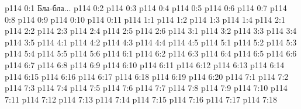 \author{Глава Серафимов}
\vs p114 0:1  Бла-бла...
\vs p114 0:2 
\vs p114 0:3 
\vs p114 0:4 
\vs p114 0:5 
\vs p114 0:6 
\vs p114 0:7 
\vs p114 0:8 
\vs p114 0:9 
\vs p114 0:10 
\vs p114 0:11 
\vs p114 1:1 
\vs p114 1:2 
\vs p114 1:3 
\vs p114 1:4 
\vs p114 2:1 
\vs p114 2:2 
\vs p114 2:3 
\vs p114 2:4 
\vs p114 2:5 
\vs p114 2:6 
\vs p114 3:1 
\vs p114 3:2 
\vs p114 3:3 
\vs p114 3:4 \pc 
\vs p114 3:5 
\vs p114 4:1 
\vs p114 4:2 
\vs p114 4:3 
\vs p114 4:4 \pc 
\vs p114 4:5 
\vs p114 5:1 
\vs p114 5:2 
\vs p114 5:3 
\vs p114 5:4 
\vs p114 5:5 \pc 
\vs p114 5:6 
\vs p114 6:1 
\vs p114 6:2 
\vs p114 6:3 
\vs p114 6:4 
\vs p114 6:5 
\vs p114 6:6 
\vs p114 6:7 
\vs p114 6:8 
\vs p114 6:9 
\vs p114 6:10 
\vs p114 6:11 
\vs p114 6:12 
\vs p114 6:13 
\vs p114 6:14 
\vs p114 6:15 
\vs p114 6:16 
\vs p114 6:17 \pc 
\vs p114 6:18 
\vs p114 6:19 
\vs p114 6:20 
\vs p114 7:1 
\vs p114 7:2 
\vs p114 7:3 
\vs p114 7:4 
\vs p114 7:5 
\vs p114 7:6 
\vs p114 7:7 \pc 
\vs p114 7:8 
\vs p114 7:9 
\vs p114 7:10 
\vs p114 7:11 
\vs p114 7:12 
\vs p114 7:13 \pc 
\vs p114 7:14 \pc 
\vs p114 7:15 
\vs p114 7:16 
\vs p114 7:17 
\vsetoff
\vs p114 7:18 
\quizlink
